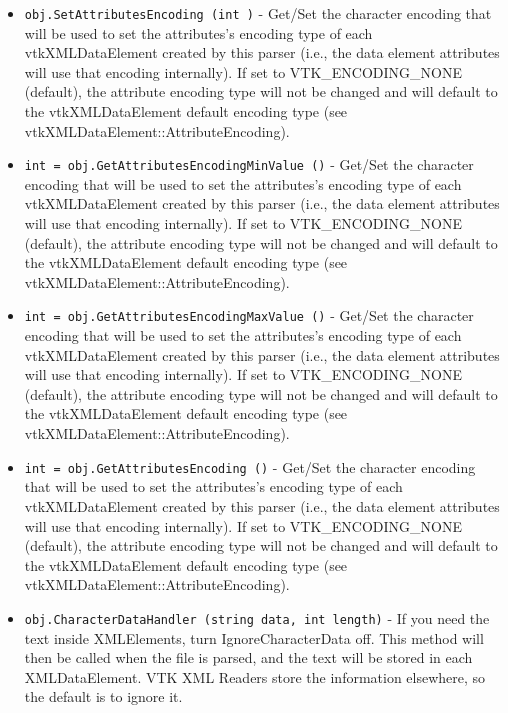 \begin{itemize}
\item  \verb|obj.SetAttributesEncoding (int )| -  Get/Set the character encoding that will be used to set the attributes's
 encoding type of each vtkXMLDataElement created by this parser (i.e.,
 the data element attributes will use that encoding internally).
 If set to VTK\_ENCODING\_NONE (default), the attribute encoding type will
 not be changed and will default to the vtkXMLDataElement default encoding
 type (see vtkXMLDataElement::AttributeEncoding).

\item  \verb|int = obj.GetAttributesEncodingMinValue ()| -  Get/Set the character encoding that will be used to set the attributes's
 encoding type of each vtkXMLDataElement created by this parser (i.e.,
 the data element attributes will use that encoding internally).
 If set to VTK\_ENCODING\_NONE (default), the attribute encoding type will
 not be changed and will default to the vtkXMLDataElement default encoding
 type (see vtkXMLDataElement::AttributeEncoding).

\item  \verb|int = obj.GetAttributesEncodingMaxValue ()| -  Get/Set the character encoding that will be used to set the attributes's
 encoding type of each vtkXMLDataElement created by this parser (i.e.,
 the data element attributes will use that encoding internally).
 If set to VTK\_ENCODING\_NONE (default), the attribute encoding type will
 not be changed and will default to the vtkXMLDataElement default encoding
 type (see vtkXMLDataElement::AttributeEncoding).

\item  \verb|int = obj.GetAttributesEncoding ()| -  Get/Set the character encoding that will be used to set the attributes's
 encoding type of each vtkXMLDataElement created by this parser (i.e.,
 the data element attributes will use that encoding internally).
 If set to VTK\_ENCODING\_NONE (default), the attribute encoding type will
 not be changed and will default to the vtkXMLDataElement default encoding
 type (see vtkXMLDataElement::AttributeEncoding).

\item  \verb|obj.CharacterDataHandler (string data, int length)| -  If you need the text inside XMLElements, turn IgnoreCharacterData off.
 This method will then be called when the file is parsed, and the text
 will be stored in each XMLDataElement. VTK XML Readers store the 
 information elsewhere, so the default is to ignore it.

\end{itemize}
